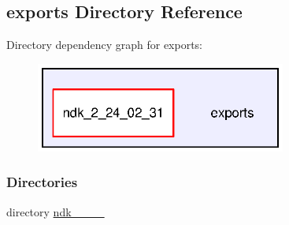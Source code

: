 \subsection{exports Directory Reference}
\label{dir_2298ed0e5bfee6f293aea6c715ac7f7c}
Directory dependency graph for exports\+:
\nopagebreak
\begin{figure}[H]
\begin{center}
\leavevmode
\includegraphics[width=233pt]{dir_2298ed0e5bfee6f293aea6c715ac7f7c_dep}
\end{center}
\end{figure}
\subsubsection*{Directories}
\begin{DoxyCompactItemize}
\item 
directory \hyperlink{dir_1021f93d0b96307b7d5f62de93307e11}{ndk\+\_\+\_\+\_\+\_}
\end{DoxyCompactItemize}
